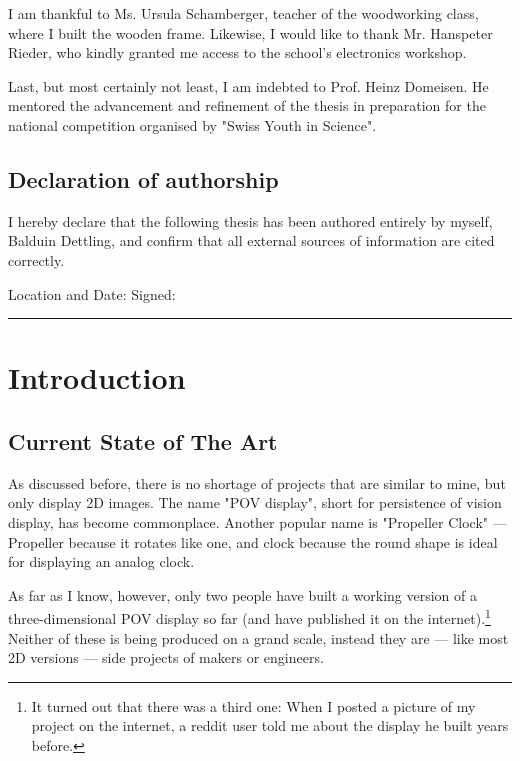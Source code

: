 \documentclass[a4paper, 11pt, titlepage]{report}
\begin{document}
I am thankful to Ms. Ursula Schamberger, teacher of the woodworking class, where I built the
wooden frame. Likewise, I would like to thank Mr. Hanspeter Rieder, who kindly granted me
access to the school's electronics workshop.

Last, but most certainly not least, I am indebted to Prof. Heinz Domeisen. He mentored the
advancement and refinement of the thesis in preparation for the national competition organised
by "Swiss Youth in Science".

\section*{Declaration of authorship}

I hereby declare that the following thesis has been authored entirely by myself, Balduin
Dettling, and confirm that all external sources of information are cited correctly.

\vspace{10mm}
\noindent Location and Date: \hspace{0.35\textwidth} Signed:\\
\rule[3mm]{\textwidth}{0.5pt} 



\tableofcontents



\chapter{Introduction}


\section{Current State of The Art}

As discussed before, there is no shortage of projects that are similar to mine, but only
display 2D images. The name "POV display", short for persistence of vision display, has become
commonplace. Another popular name is "Propeller Clock" --- Propeller because it rotates like one,
and clock because the round shape is ideal for displaying an analog clock.

As far as I know, however, only two people have built a working version of a three-dimensional
POV display so far (and have published it on the internet).\footnote{It turned out that there was
a third one: When I posted a picture of my project on the internet, a reddit user told me about
the display he built years before.}
Neither of these is being produced on a grand scale, instead they are --- like most 2D versions
--- side projects of makers or engineers.
\end{document}
